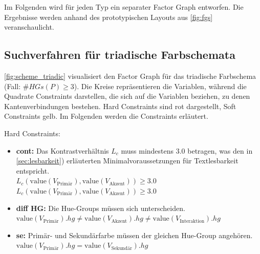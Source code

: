 Im Folgenden wird für jeden Typ ein separater Factor Graph entworfen. Die Ergebnisse werden anhand des prototypischen Layouts aus \autoref{fig:fgs} veranschaulicht.

\subsection{Suchverfahren für triadische Farbschemata}

\autoref{fig:scheme_triadic} visualisiert den Factor Graph für das triadische Farbschema (Fall: $\#HGs(P) \geq 3$). Die Kreise repräsentieren die Variablen, während die Quadrate Constraints darstellen, die sich auf die Variablen beziehen, zu denen Kantenverbindungen bestehen. Hard Constraints sind rot dargestellt, Soft Constraints gelb. Im Folgenden werden die Constraints erläutert.

Hard Constraints:
\begin{itemize}
	\item \textbf{cont:} Das Kontrastverhältnis $L_c$ muss mindestens 3.0 betragen, was den in \autoref{sec:lesbarkeit}) erläuterten Minimalvoraussetzungen für Textlesbarkeit  entspricht.\\
		$L_c(\text{value}(V_\text{Primär}), \text{value}(V_\text{Akzent})) \geq 3.0$\\
		$L_c(\text{value}(V_\text{Primär}), \text{value}(V_\text{Akzent})) \geq 3.0$
	\item \textbf{diff HG:} Die Hue-Groups müssen sich unterscheiden. \\ $\text{value}(V_\text{Primär}).hg \neq \text{value}(V_\text{Akzent}).hg \neq \text{value}(V_\text{Interaktion}).hg$
	\item \textbf{se:} Primär- und Sekundärfarbe müssen der gleichen Hue-Group angehören.\\
		$\text{value}(V_\text{Primär}).hg = \text{value}(V_\text{Sekundär}).hg$
\end{itemize}

